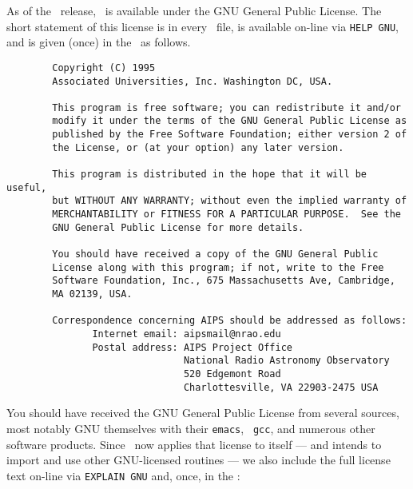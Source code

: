 As of the \RELEASENAME\ release, \AIPS\ is available under the GNU
General Public License.  The short statement of this license is in
every \AIPS\ file, is available on-line via {\tt HELP GNU}, and is
given (once) in the \Aipsletter\ as follows.
\vskip -10pt
\begin{verbatim}
        Copyright (C) 1995
        Associated Universities, Inc. Washington DC, USA.

        This program is free software; you can redistribute it and/or
        modify it under the terms of the GNU General Public License as
        published by the Free Software Foundation; either version 2 of
        the License, or (at your option) any later version.

        This program is distributed in the hope that it will be useful,
        but WITHOUT ANY WARRANTY; without even the implied warranty of
        MERCHANTABILITY or FITNESS FOR A PARTICULAR PURPOSE.  See the
        GNU General Public License for more details.

        You should have received a copy of the GNU General Public
        License along with this program; if not, write to the Free
        Software Foundation, Inc., 675 Massachusetts Ave, Cambridge,
        MA 02139, USA.

        Correspondence concerning AIPS should be addressed as follows:
               Internet email: aipsmail@nrao.edu
               Postal address: AIPS Project Office
                               National Radio Astronomy Observatory
                               520 Edgemont Road
                               Charlottesville, VA 22903-2475 USA
\end{verbatim}
\vskip -10pt
You should have received the GNU General Public License from several
sources, most notably GNU themselves with their {\tt emacs}, {\tt
gcc}, and numerous other software products.  Since \AIPS\ now applies
that license to itself --- and intends to import and use other
GNU-licensed routines --- we also include the full license text
on-line via {\tt EXPLAIN GNU} and, once, in the \Aipsletter:


